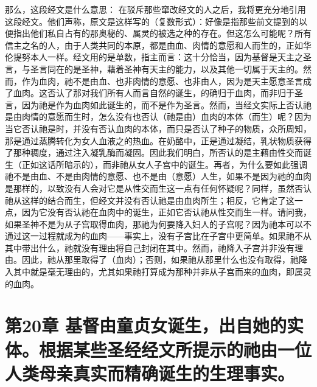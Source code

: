 那么，这段经文是什么意思： 在驳斥那些窜改经文的人之后，我将更充分地引用这段经文。他们声称，原文是这样写的（复数形式）：好像是指那些前文提到的以便指出他们私自占有的那奥秘的、属灵的被选之种的存在。但这怎么可能呢？所有信主之名的人，由于人类共同的本原，都是由血、肉情的意愿和人而生的，正如华伦提努本人一样。经文用的是单数，指主而言：这十分恰当，因为基督是天主之圣言，与圣言同在的是圣神，藉着圣神有天主的能力，以及其他一切属于天主的。然而，作为血肉，祂不是由血、也非肉情的意愿、也非由人，因为是天主愿意圣言成了血肉。这否认了那对我们所有人而言自然的诞生，的确归于血肉，而非归于圣言，因为祂是作为血肉如此诞生的，而不是作为圣言。然而，当经文实际上否认祂是由肉情的意愿而生时，怎么没有也否认（祂是由）血肉的本体（而生）呢？因为当它否认祂是时，并没有否认血肉的本体，而只是否认了种子的物质，众所周知，那是通过蒸腾转化为女人血液之的热血。在奶酪中，正是通过凝结，乳状物质获得了那种稠度，通过注入凝乳酶而凝固。因此我们明白，所否认的是主藉由性交而诞生（正如这话所暗示的），而非祂从女人子宫中的诞生。再者，为什么要如此强调祂不是由血、不是由肉情的意愿、也不是由（意愿）人生，如果不是因为祂的血肉是那样的，以致没有人会对它是从性交而生这一点有任何怀疑呢？同样，虽然否认祂从这样的结合而生，但经文并没有否认祂是由血肉所生；相反，它肯定了这一点，因为它没有否认祂在血肉中的诞生，正如它否认祂从性交而生一样。请问我，如果圣神不是为从子宫取得血肉，那祂为何要降入妇人的子宫呢？因为祂本可以不通过这一过程就成为的血肉——事实上，没有子宫比在子宫中更简单。如果祂不从其中带出什么，祂就没有理由将自己封闭在其中。然而，祂降入子宫并非没有理由。因此，祂从那里取得了（血肉）；否则，如果祂从那里什么也没有取得，祂降入其中就是毫无理由的，尤其如果祂打算成为那种并非从子宫而来的血肉，即属灵的血肉。\par


\section{第20章 基督由童贞女诞生，出自她的实体。根据某些圣经经文所提示的祂由一位人类母亲真实而精确诞生的生理事实。}

